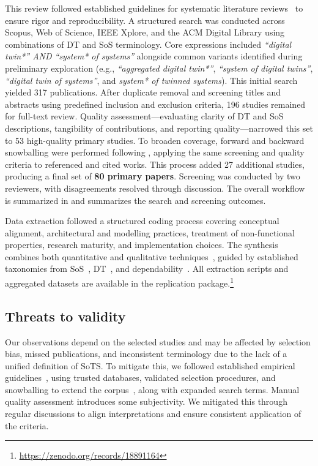 This review followed established guidelines for systematic literature reviews~\cite{kitchenham2007guidelines, wohlin2020guidelines} to ensure rigor and reproducibility. A structured search was conducted across Scopus, Web of Science, IEEE Xplore, and the ACM Digital Library using combinations of DT and SoS terminology. Core expressions included \textit{“digital twin*” AND “system* of systems”} alongside common variants identified during preliminary exploration (e.g., \textit{“aggregated digital twin*”}, \textit{“system of digital twins”}, \textit{“digital twin of systems”}, and \textit{system* of twinned systems}). This initial search yielded 317 publications. After duplicate removal and screening titles and abstracts using predefined inclusion and exclusion criteria, 196 studies remained for full-text review. Quality assessment---evaluating clarity of DT and SoS descriptions, tangibility of contributions, and reporting quality---narrowed this set to 53 high-quality primary studies. To broaden coverage, forward and backward snowballing were performed following \citet{wohlin2020guidelines}, applying the same screening and quality criteria to referenced and cited works. This process added 27 additional studies, producing a final set of \textbf{80 primary papers}. Screening was conducted by two reviewers, with disagreements resolved through discussion. The overall workflow is summarized in  and  summarizes the search and screening outcomes.



Data extraction followed a structured coding process covering conceptual alignment, architectural and modelling practices, treatment of non-functional properties, research maturity, and implementation choices. The synthesis combines both quantitative and qualitative techniques~\cite{franzosi2010quantitative, rodgers2009testing}, guided by established taxonomies from SoS~\cite{nielsen2015systems}, DT~\cite{kritzinger2018digital, david2024infonomics}, and dependability~\cite{avizienis2004basic}. All extraction scripts and aggregated datasets are available in the replication package.\footnote{\url{https://zenodo.org/records/18891164}}


\subsection{Threats to validity}\label{sec:literature-review-threats}
Our observations depend on the selected studies and may be affected by selection bias, missed publications, and inconsistent terminology due to the lack of a unified definition of SoTS. To mitigate this, we followed established empirical guidelines~\cite{wohlin2020guidelines}, using trusted databases, validated selection procedures, and snowballing to extend the corpus~\cite{greenhalgh2005effectiveness}, along with expanded search terms. Manual quality assessment introduces some subjectivity. We mitigated this through regular discussions to align interpretations and ensure consistent application of the criteria.

